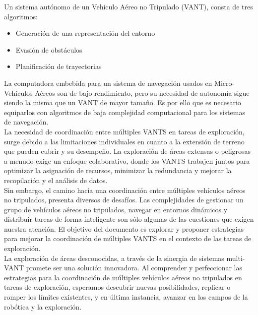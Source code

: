 \documentclass[sigconf]{acmart}
\begin{document}
Un sistema autónomo de un Vehículo Aéreo no Tripulado (VANT), consta de tres algoritmos:

\begin{itemize}
\item Generación de una representación del entorno
\item Evasión de obstáculos
\item Planificación de trayectorias
\end{itemize}

La computadora embebida para un sistema de navegación usados en Micro-Vehículos Aéreos son de bajo rendimiento, pero su necesidad de autonomía sigue siendo la misma que un VANT de mayor tamaño. Es por ello que es necesario equiparlos con algoritmos de baja complejidad computacional para los sistemas de navegación.\\

La necesidad de coordinación entre múltiples VANTS en tareas de exploración, surge debido a las limitaciones individuales en cuanto a la extensión de terreno que pueden cubrir y su desempeño. La exploración de áreas extensas o peligrosas a menudo exige un enfoque colaborativo, donde los VANTS trabajen juntos para optimizar la asignación de recursos, minimizar la redundancia y mejorar la recopilación y el análisis de datos.\\

Sin embargo, el camino hacia una coordinación entre múltiples vehículos aéreos no tripulados, presenta diversos de desafíos. Las complejidades de gestionar un grupo de vehículos aéreos no tripulados, navegar en entornos dinámicos y distribuir tareas de forma inteligente son sólo algunas de las cuestiones que exigen nuestra atención. El objetivo del documento es explorar y proponer estrategias para mejorar la coordinación de múltiples VANTS en el contexto de las tareas de exploración.\\


La exploración de áreas desconocidas, a través de la sinergia de sistemas multi-VANT promete ser una solución innovadora. Al comprender y perfeccionar las estrategias para la coordinación de múltiples vehículos aéreos no tripulados en tareas de exploración, esperamos descubrir nuevas posibilidades, replicar o romper los límites existentes, y en última instancia, avanzar en los campos de la robótica y la exploración.\\
\end{document}
